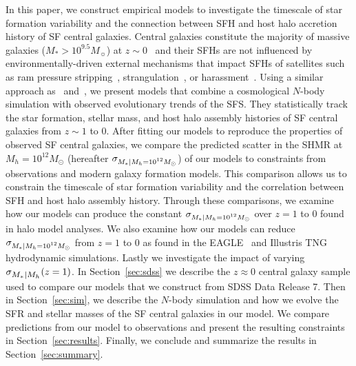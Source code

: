 \documentclass[12pt, letterpaper, preprint, tighten]{aastex62}
\newcommand{\siglogm}{\sigma_{\scaleto{M_*|M_h}{8pt}}}
\newcommand{\sigtwe}{\sigma_{\scaleto{M_*|M_h=10^{12}M_\odot}{8pt}}}
\begin{document}
In this paper, we construct empirical models to investigate the timescale
of star formation variability and the connection between SFH and host halo
accretion history of SF central galaxies. Central galaxies constitute the 
majority of massive galaxies ($M_*>10^{9.5}M_\sun$) at $z\sim0$~\citep{wetzel2013} 
and their SFHs are not influenced by environmentally-driven external 
mechanisms that impact SFHs of satellites such as ram pressure 
stripping~\citep{gunn1972,bekki2009}, strangulation~\citep{larson1980, peng2015}, 
or harassment~\citep{moore1998}. Using a similar approach as~\cite{wetzel2013} and~\cite{hahn2017b}, 
we present models that combine a cosmological $N$-body simulation with observed 
evolutionary trends of the SFS. They statistically 
track the star formation, stellar mass, and host halo assembly histories of 
SF central galaxies from $z\sim1$ to $0$. After fitting our models to reproduce 
the properties of observed SF central galaxies, we compare the predicted 
scatter in the SHMR at $M_h=10^{12}M_\odot$ (hereafter $\sigtwe$) 
of our models to constraints from observations and modern galaxy formation 
models. This comparison allows us to constrain the timescale of star formation 
variability and the correlation between SFH and host halo assembly history. 
Through these comparisons, we examine how our models can produce the constant 
$\sigtwe$ over $z=1$ to 0 found in halo model analyses. We also examine how 
our models can reduce $\sigtwe$ from $z=1$ to 0 as found in the EAGLE~\citep{matthee2017} 
and Illustris TNG~\citep{pillepich2018} hydrodynamic simulations. Lastly 
we investigate the impact of varying $\siglogm(z=1)$. In 
Section~\ref{sec:sdss} we describe the $z\approx0$ central galaxy sample used to compare our models that we 
construct from SDSS Data Release 7. Then in Section~\ref{sec:sim}, we 
describe the $N$-body simulation and how we evolve the SFR and stellar 
masses of the SF central galaxies in our model. We compare predictions 
from our model to observations and present the resulting constraints in 
Section~\ref{sec:results}. Finally, we conclude and summarize the results 
in Section~\ref{sec:summary}.
\end{document}
